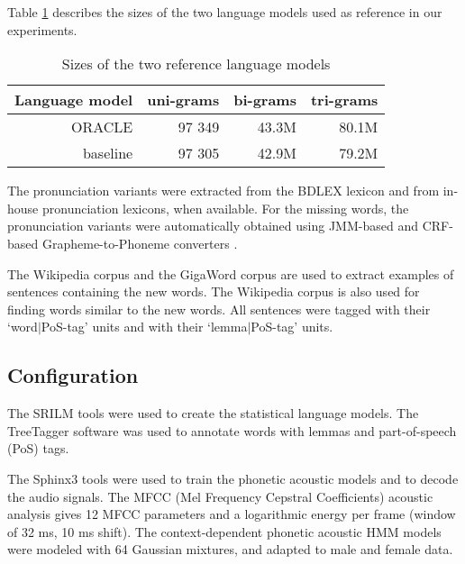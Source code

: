 \documentclass[conference]{IEEEtran}
\begin{document}
Table \ref{Tab:LMs} describes the sizes of the two language models used as reference in our experiments.

\begin{table}[!t]
\caption{Sizes of the two reference language models}
\label{Tab:LMs}
\centering
\begin{tabular}{|r|r|r|r|}
\hline
{\bf Language model}  	& uni-grams 	& bi-grams 	& tri-grams 	\\ \hline
ORACLE  		& 97 349  	& 43.3M  	& 80.1M 	\\ \hline
baseline 		& 97 305  	& 42.9M   	& 79.2M		\\ \hline
\end{tabular}
\end{table}

The pronunciation variants were extracted from the BDLEX lexicon \cite{Calmes:1998} and from in-house pronunciation lexicons, when available. 
For the missing words, the pronunciation variants were automatically obtained using JMM-based and CRF-based Grapheme-to-Phoneme converters \cite{Illina:2011, Jouvet:2012}. 

The Wikipedia corpus \cite{WikipediaFR}  and the GigaWord corpus \cite{Mendoca:2011} are used to extract examples of sentences containing the new words.
The Wikipedia corpus is also used for finding words similar to the new words. All sentences were tagged with their `word$|$PoS-tag' units and with their `lemma$|$PoS-tag' units. 

\subsection{Configuration}

The SRILM tools \cite{Stolcke:2002} were used to create the statistical language models. 
The TreeTagger software \cite{Schmid:1994} was used to annotate words with lemmas and part-of-speech (PoS) tags.

The Sphinx3 tools \cite{Placeway:1996} were used to train the phonetic acoustic models and to decode the audio signals. 
The MFCC (Mel Frequency Cepstral Coefficients) acoustic analysis gives 12 MFCC parameters and a logarithmic energy per frame (window of 32
ms, 10 ms shift). 
The context-dependent phonetic acoustic HMM models were modeled with 64 Gaussian mixtures, and adapted to male and female data. 
\end{document}
